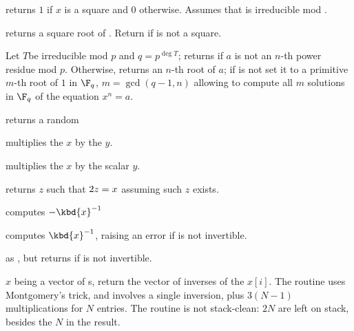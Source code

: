  returns $1$ if $x$ is a square
and $0$ otherwise. Assumes that  is irreducible mod .

 returns a square root of .
Return  if  is not a square.

Let $T$be irreducible mod $p$ and $q = p^{\deg T}$; returns  if $a$
is not an $n$-th power residue mod $p$. Otherwise, returns an $n$-th root of
$a$; if  is not  set it to a primitive $m$-th root of $1$
in $\F_q$, $m = \gcd(q-1,n)$ allowing to compute all $m$ solutions in $\F_q$
of the equation $x^n = a$.


 returns a random 




 multiplies the  $x$
by the  $y$.

 multiplies the  $x$
by the scalar $y$.

 returns $z$ such that $2\*z = x$
assuming such $z$ exists.



 computes $-\kbd{x}^{-1}$

 computes $\kbd{x}^{-1}$, raising an
error if  is not invertible.

 as , but returns
 if  is not invertible.


 $x$ being a vector of s,
return the vector of inverses of the $x[i]$. The routine uses Montgomery's
trick, and involves a single inversion, plus $3(N-1)$ multiplications for
$N$ entries. The routine is not stack-clean: $2N$  are left on
stack, besides the $N$ in the result.

